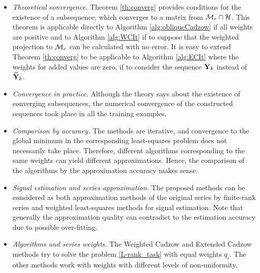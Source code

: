 \documentclass[sii]{ipart}
\begin{document}
	\begin{itemize}
		\item \textit{Theoretical convergence.}
		Theorem \ref{th:converg} provides conditions for the existence of a subsequence, which converges to a matrix from $\mathcal{M}_r \cap \mathcal{H}$. This theorem is applicable directly to Algorithm \ref{alg:obliqueCadzow} if all weights are positive and to Algorithm \ref{alg:WCIt} if to suppose that the weighted projection to $\mathcal{M}_r$ can be calculated with no error. It is easy to extend Theorem \ref{th:converg} to be applicable to Algorithm \ref{alg:ECIt} where the weights for added values are zero, if to consider the sequence  $\mathbf{Y}_k$ instead of $\widetilde{\mathbf{Y}}_k$.
		\item \textit{Convergence in practice.} Although the theory says about the existence of converging subsequences, the numerical convergence of the constructed sequences took place in all the training examples.
		\item \textit{Comparison by accuracy.}
		The methods are iterative, and convergence to the global minimum in the corresponding least-squares problem does not necessarily take place. Therefore, different algorithms corresponding to the same weights can yield different approximations. Hence, the comparison of the algorithms by the approximation accuracy makes sense.		
\item \textit{Signal estimation and series approximation.}
		The proposed methods can be considered as both approximation methods of the original series by finite-rank series and weighted least-squares methods for signal estimation. Note that generally the approximation quality can contradict to the estimation accuracy due to possible over-fitting.
		\item \textit{Algorithms and series weights.}
		The Weighted Cadzow and Extended Cadzow methods try to solve the problem \eqref{L-rank_task} with equal weights $q_i$. The other methods work with weights with different levels of non-uniformity.

\end{itemize}
\end{document}
